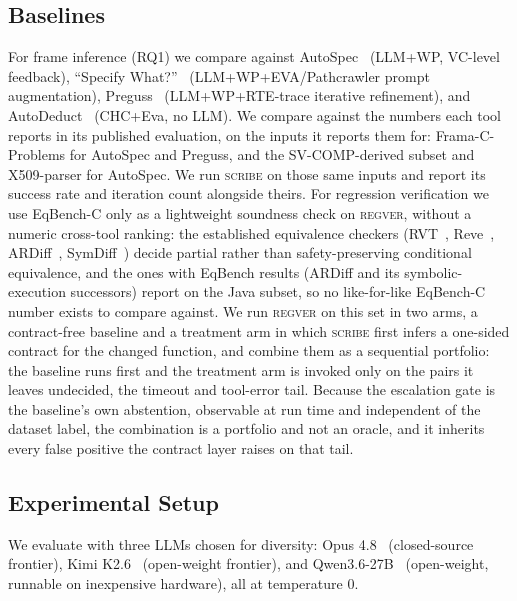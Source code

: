 \documentclass[conference]{IEEEtran}
\theoremstyle{definition}
\theoremstyle{remark}
\begin{document}
\subsection{Baselines}\label{subsec:baselines}

For frame inference (RQ1) we compare against
AutoSpec~\cite{wen2024autospec} (LLM+WP, VC-level feedback),
``Specify What?''~\cite{granberry2024specifywhat}
(LLM+WP+EVA/Pathcrawler prompt augmentation),
Preguss~\cite{wang2025preguss} (LLM+WP+RTE-trace iterative
refinement), and AutoDeduct~\cite{amilon2025autodeduct} (CHC+Eva, no
LLM). We compare against the numbers each tool reports in its
published evaluation, on the inputs it reports them for:
Frama-C-Problems for AutoSpec and Preguss, and the SV-COMP-derived
subset and X509-parser for AutoSpec. We run \textsc{scribe} on those
same inputs and report its success rate and iteration count
alongside theirs. For regression
verification we use EqBench-C only as a lightweight soundness check
on \textsc{regver}, without a numeric cross-tool ranking: the
established equivalence checkers (RVT~\cite{godlin2013rv},
  Reve~\cite{klebanov2018reve}, ARDiff~\cite{badihi2020ardiff},
SymDiff~\cite{lahiri2012symdiff}) decide partial rather than
safety-preserving conditional equivalence, and the ones with EqBench
results (ARDiff and its symbolic-execution successors) report on the
Java subset, so no like-for-like EqBench-C number exists to compare against.
We run \textsc{regver} on this set in two arms, a contract-free baseline and a
treatment arm in which \textsc{scribe} first infers a one-sided contract for
the changed function, and combine them as a sequential portfolio: the baseline
runs first and the treatment arm is invoked only on the pairs it leaves
undecided, the timeout and tool-error tail. Because the escalation gate is the
baseline's own abstention, observable at run time and independent of the
dataset label, the combination is a portfolio and not an oracle, and it
inherits every false positive the contract layer raises on that tail.

\subsection{Experimental Setup}

We evaluate with three LLMs chosen
for diversity: Opus 4.8~\cite{anthropic_claude_opus_4_8}
(closed-source frontier), Kimi K2.6~\cite{moonshotai_kimi_k2_6}
(open-weight frontier), and Qwen3.6-27B~\cite{qwen3.6-27b}
(open-weight, runnable on inexpensive hardware), all at temperature $0$.
\end{document}
